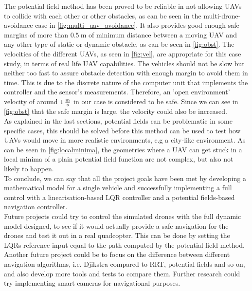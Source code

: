 \documentclass[journal, twoside]{IEEEtran}
\begin{document}
	The potential field method has been proved to be reliable in not allowing UAVs to collide with each other or other obstacles, as can be seen in the multi-drone-avoidance case in \figurename{ \ref{fig:multi_uav_avoidance}}. It also provides good enough safe margins of more than $\SI{0.5}{\meter}$ of minimum distance between a moving UAV and any other type of static or dynamic obstacle, as can be seen in \figurename{ \ref{fig:obst}}. The velocities of the different UAVs, as seen in \figurename{ \ref{fig:vel}}, are appropriate for this case study, in terms of real life UAV capabilities. The vehicles should not be slow but neither too fast to assure obstacle detection with enough margin to avoid them in time. This is due to the discrete nature of the computer unit that implements the controller and the sensor's measurements. Therefore, an 'open environment' velocity of around $\SI{1}{\frac{\meter}{\second}}$ in our case is considered to be safe. Since we can see in \figurename{ \ref{fig:obst}} that the safe margin is large, the velocity could also be increased. \\
	
	As explained in the last sections, potential fields can be problematic in some specific cases, this should be solved before this method can be used to test how UAVs would move in more realistic environments, e.g a city-like environment. As can be seen in \figurename{ \ref{fig:localminima}}, the geometries where a UAV can get stuck in a local minima of a plain potential field function are not complex, but also not likely to happen.\\
	
	To conclude, we can say that all the project goals have been met by developing a mathematical model for a single vehicle and successfully implementing a full control with a linearisation-based LQR controller and a potential fields-based navigation controller.\\

	Future projects could try to control the simulated drones with the full dynamic model designed, to see if it would actually provide a safe navigation for the drones and test it out in a real quadcopter. This can be done by setting the LQRs reference input equal to the path computed by the potential field method. Another future project could be to focus on the difference between different navigation algorithms, i.e. Djikstra compared to RRT, potential fields and so on, and also develop more tools and tests to compare them. Further research could try implementing smart cameras for navigational purposes.
	
\end{document}
